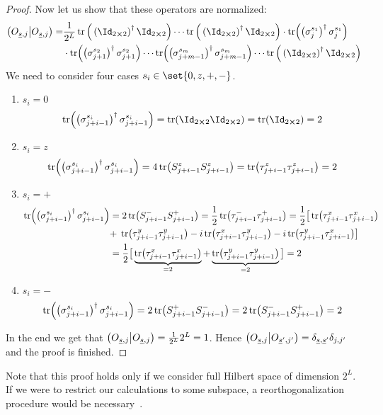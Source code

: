 \begin{proof}
    Now let us show that these operators are normalized:
    \begin{align}
        \hs{O_{\underline{s},j}}{O_{\underline{s},j}} =& \frac{1}{\dimension} 
        \tr\Big(\left(\Id_{2\cross 2}\right)^{\dagger}\Id_{2\cross 2}\Big) \cdots 
        \tr\Big(\left(\Id_{2\cross 2}\right)^{\dagger}\Id_{2\cross 2}\Big)
        \cdot \tr(\left(\sigma_j^{s_1}\right)^{\dagger} \sigma_j^{s_1})\nonumber\\ 
        &\cdot \tr(\left(\sigma_{j+1}^{s_2}\right)^{\dagger} \sigma_{j+1}^{s_2})
        \cdots \tr(\left(\sigma_{j+m-1}^{s_m}\right)^{\dagger} \sigma_{j+m-1}^{s_m}) \cdots 
        \tr\Big(\left(\Id_{2\cross 2}\right)^{\dagger}\Id_{2\cross 2}\Big)
    \end{align}
    We need to consider four cases \(s_i\in \set{0,z,+,-}\).
    \begin{enumerate}
        \item {\(s_i = 0\)
        \begin{equation*}
            \tr(\left(\sigma_{j+i-1}^{s_i}\right)^{\dagger} \sigma_{j+i-1}^{s_i}) = \tr(\Id_{2\cross 2}\Id_{2\cross 2}) = 
            \tr(\Id_{2\cross 2}) = 2
        \end{equation*}
        }
        \item {\(s_i = z\)
        \begin{equation*}
            \tr(\left(\sigma_{j+i-1}^{s_i}\right)^{\dagger} \sigma_{j+i-1}^{s_i}) = 4\tr(S^{z}_{j+i-1} S^{z}_{j+i-1}) = 
            \tr(\tau_{j+i-1}^{z} \tau_{j+i-1}^{z}) = 2
        \end{equation*}
        }
        \item { \(s_i = +\)
        \begin{align*}
            \tr(\left(\sigma_{j+i-1}^{s_i}\right)^{\dagger} \sigma_{j+i-1}^{s_i}) =& \;2\tr(S^{-}_{j+i-1} S^{+}_{j+i-1}) =
            \frac{1}{2} \tr(\tau^{-}_{j+i-1}\tau^{+}_{j+i-1})  
            =\frac{1}{2} \big[\tr(\tau^{x}_{j+i-1}\tau^{x}_{j+i-1})\\
            +\;&\tr(\tau^{y}_{j+i-1}\tau^{y}_{j+i-1})
            - i\tr(\tau^{x}_{j+i-1}\tau^{y}_{j+i-1}) -i\tr(\tau^{y}_{j+i-1}\tau^{x}_{j+i-1})\big] \\
            =&\; \frac{1}{2}\big[  \underbrace{\tr(\tau^{x}_{j+i-1}\tau^{x}_{j+i-1})}_{=2}
            +\underbrace{\tr(\tau^{y}_{j+i-1}\tau^{y}_{j+i-1})}_{=2} \big] = 2
        \end{align*}
        }
        \item { \(s_i = -\)
        \begin{align*}
            \tr(\left(\sigma_{j+i-1}^{s_i}\right)^{\dagger} \sigma_{j+i-1}^{s_i}) =
             2\tr(S^{+}_{j+i-1} S^{-}_{j+i-1}) = 2\tr(S^{-}_{j+i-1} S^{+}_{j+i-1}) = 2 
        \end{align*}
        }
    \end{enumerate}
    In the end we get that \(\left(O_{\underline{s},j} \middle| O_{\underline{s},j}\right) = \frac{1}{2^L}2^L = 1\).
    Hence \( \left(O_{\underline{s},j} \middle| O_{\underline{s}^{\prime},j^{\prime}}\right)
    =\delta_{\underline{s},\underline{s}^{\prime}}\delta_{j,j^{\prime}}\) and the proof is finished.
\end{proof}
Note that this proof holds only if we consider full Hilbert space of dimension \(2^L\).
If we were to restrict our calculations to some subspace, a reorthogonalization procedure
would be necessary~\autocite{Mierzejewski2015a}.